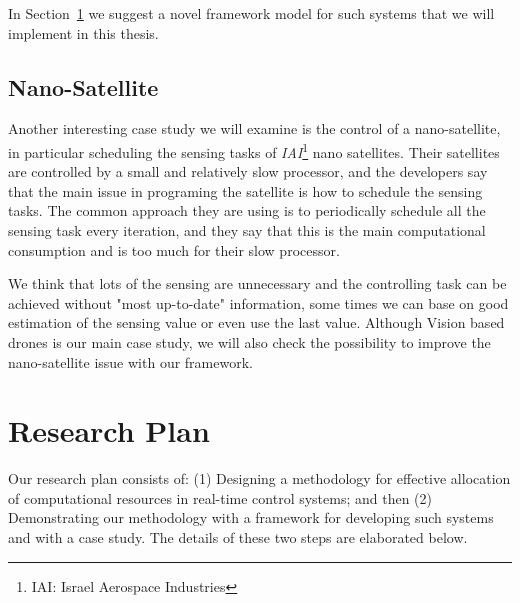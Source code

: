 \documentclass[11pt]{article}
\begin{document}

In Section~\ref{sec:Research Plan} we suggest a novel framework model for such systems that we will implement in this thesis.

\subsection{Nano-Satellite}
Another interesting case study we will examine is the control of a nano-satellite, in particular scheduling the sensing tasks of \textit{IAI}\footnote{IAI: Israel Aerospace Industries} nano satellites. Their satellites are controlled by a small and relatively slow processor, and the developers say that the main issue in programing the satellite is how to schedule the sensing tasks.
The common approach they are using is to periodically schedule all the sensing task every iteration, and they say that this is the main computational consumption and is too much for their slow processor.

We think that lots of the sensing are unnecessary and the controlling task can be achieved without "most up-to-date" information, some times we can base on good estimation of the sensing value or even use the last value. Although Vision based drones is our main case study, we will also check the possibility to improve the nano-satellite issue with our framework.

\section{Research Plan}
\label{sec:Research Plan}

Our research plan consists of: (1) Designing a methodology for effective allocation of computational resources in real-time control systems; and then (2) Demonstrating our methodology with a framework for developing such systems and with a case study. The details of these two steps are elaborated below.
\end{document}
